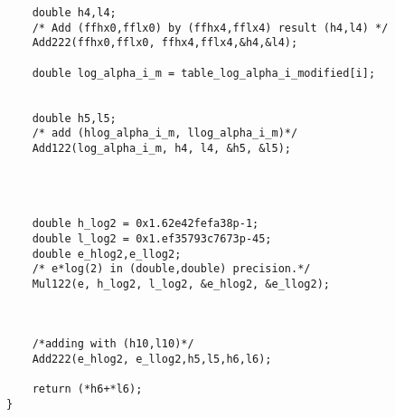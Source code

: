 \begin{lstlisting}
    double h4,l4;
    /* Add (ffhx0,fflx0) by (ffhx4,fflx4) result (h4,l4) */
    Add222(ffhx0,fflx0, ffhx4,fflx4,&h4,&l4);
    
    double log_alpha_i_m = table_log_alpha_i_modified[i];
   
    
    double h5,l5;
    /* add (hlog_alpha_i_m, llog_alpha_i_m)*/
    Add122(log_alpha_i_m, h4, l4, &h5, &l5);
    
    
    
    
    double h_log2 = 0x1.62e42fefa38p-1;
    double l_log2 = 0x1.ef35793c7673p-45;
    double e_hlog2,e_llog2;
    /* e*log(2) in (double,double) precision.*/
    Mul122(e, h_log2, l_log2, &e_hlog2, &e_llog2);
    
   

    /*adding with (h10,l10)*/
    Add222(e_hlog2, e_llog2,h5,l5,h6,l6);
    
    return (*h6+*l6);
}
\end{lstlisting}
\newpage

